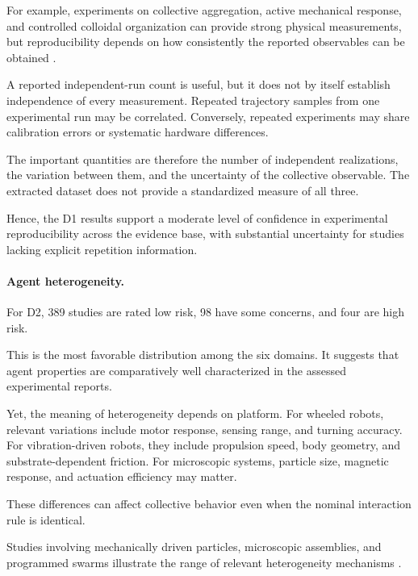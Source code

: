 For example, experiments on collective
aggregation, active mechanical response,
and controlled colloidal organization
can provide strong physical measurements,
but reproducibility depends on how
consistently the reported observables
can be obtained
\cite{Garnier2005aggregationbehaviou,Buerle2020formationofstable,Heuthe2025tunablecolloidalsw,Arbel2025amechanicalroutef,Boudet2025nonmarkoviandynami,Chen2024persistentandrespo,Wang2025hyperuniformnetwork}.

A reported independent-run count is useful,
but it does not by itself establish
independence of every measurement.
Repeated trajectory samples from one
experimental run may be correlated.
Conversely, repeated experiments may
share calibration errors or
systematic hardware differences.

The important quantities are therefore
the number of independent realizations,
the variation between them, and the
uncertainty of the collective observable.
The extracted dataset does not provide
a standardized measure of all three.

Hence, the D1 results support a
moderate level of confidence in
experimental reproducibility across
the evidence base, with substantial
uncertainty for studies lacking
explicit repetition information.

\paragraph*{Agent heterogeneity.}

For D2, 389 studies are rated low risk,
98 have some concerns, and four
are high risk.

This is the most favorable distribution
among the six domains. It suggests that
agent properties are comparatively
well characterized in the assessed
experimental reports.

Yet, the meaning of heterogeneity
depends on platform. For wheeled
robots, relevant variations include
motor response, sensing range,
and turning accuracy. For vibration-driven
robots, they include propulsion
speed, body geometry, and
substrate-dependent friction.
For microscopic systems, particle
size, magnetic response, and
actuation efficiency may matter.

These differences can affect collective
behavior even when the nominal
interaction rule is identical.

Studies involving mechanically driven
particles, microscopic assemblies,
and programmed swarms illustrate
the range of relevant
heterogeneity mechanisms
\cite{Welch2018aggregatesuppressio,Deblais2019howtoforceanarmy,Xie2020bioinspiredsoftmic,Pauer2021programmabledesign,Li2019particleroboticsba,Vsrhelyi2018optimizedflockingo,Zion2023morphologicalcomput}.

